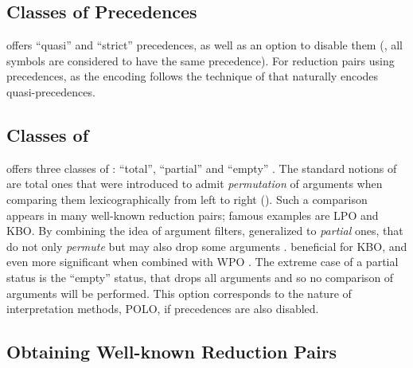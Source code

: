\documentclass{llncs}
\begin{document}
\subsection{Classes of Precedences}

\NaTT offers ``quasi'' and ``strict'' precedences, as well as
an option to disable them (\ie,
all symbols are considered to have the same precedence).
For reduction pairs using precedences,
as the encoding follows the technique of \cite{ZHM09}
that naturally encodes quasi-precedences.

\subsection{Classes of }

\NaTT offers three classes of :
``total'',
``partial'' and ``empty'' .
The standard notions of  are total ones that
were introduced to admit
\emph{permutation} of arguments when comparing them 
lexicographically from left to right (\cf \cite{S89}).
Such a comparison appears in many well-known reduction pairs;
famous examples are LPO and KBO.
By combining the idea of argument filters,
 generalized to \emph{partial} ones,
that do not only \emph{permute} but may also drop some arguments \cite{YKS13b}.
beneficial for KBO,
and even more significant when combined with WPO \cite{YKS14}.
The extreme case of a partial status is the ``empty'' status,
that drops all arguments and so no comparison of arguments will be
performed. 
This option corresponds to the nature of interpretation methods, \eg POLO,
if precedences are also disabled.


\subsection{Obtaining Well-known Reduction Pairs}
\end{document}
